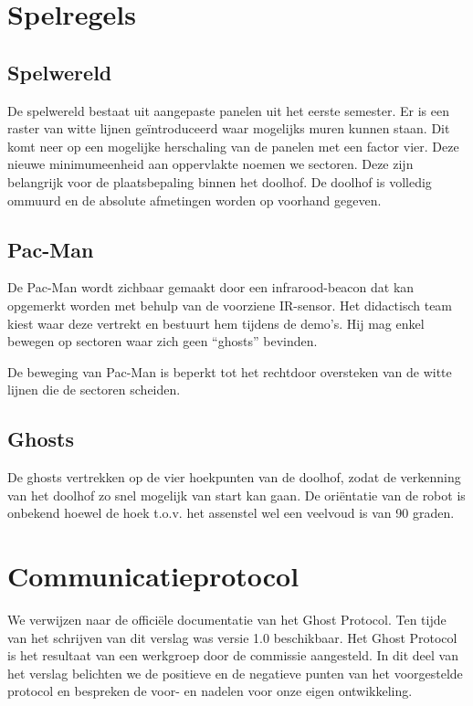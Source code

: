 \documentclass[12pt,a4paper]{report}
\begin{document}
\section{Spelregels}

\subsection{Spelwereld}

De spelwereld bestaat uit aangepaste panelen uit het eerste semester. Er is een raster van witte lijnen ge\"introduceerd waar mogelijks muren kunnen staan. Dit komt neer op een mogelijke herschaling van de panelen met een factor vier. Deze nieuwe minimumeenheid aan oppervlakte noemen we sectoren. Deze zijn belangrijk voor de plaatsbepaling binnen het doolhof. De doolhof is volledig ommuurd en de absolute afmetingen worden op voorhand gegeven.

\subsection{Pac-Man}

De Pac-Man wordt zichbaar gemaakt door een infrarood-beacon dat kan opgemerkt worden met behulp van de voorziene IR-sensor. Het didactisch team kiest waar deze vertrekt en bestuurt hem tijdens de demo's. Hij mag enkel bewegen op sectoren waar zich geen ``ghosts'' bevinden.

De beweging van Pac-Man is beperkt tot het rechtdoor oversteken van de witte lijnen die de sectoren scheiden.

\subsection{Ghosts}

De ghosts vertrekken op de vier hoekpunten van de doolhof, zodat de verkenning van het doolhof zo snel mogelijk van start kan gaan. De ori\"entatie van de robot is onbekend hoewel de hoek t.o.v. het assenstel wel een veelvoud is van 90 graden.


\section{Communicatieprotocol}

We verwijzen naar de offici\"ele documentatie van het Ghost Protocol. Ten tijde van het schrijven van dit verslag was versie 1.0 beschikbaar. Het Ghost Protocol is het resultaat van een werkgroep door de commissie aangesteld. In dit deel van het verslag belichten we de positieve en de negatieve punten van het voorgestelde protocol en bespreken de voor- en nadelen voor onze eigen ontwikkeling.
\end{document}
